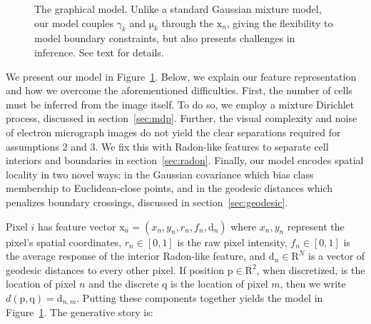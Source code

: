 \documentclass[english]{article}
\newcommand{\plate}[4]{
\begin{pgfonlayer}{b}
\node (invis#1) [draw, color=white, inner sep=6pt,rectangle,fit=#2] {};
\end{pgfonlayer}\begin{pgfonlayer}{f}
\node (capt#1) [ below left=0 pt of invis#1.south east, xshift=1pt,yshift=1pt] {\footnotesize{#3}};
\node (#1) [draw,inner sep=1pt, rectangle,fit=(invis#1) (capt#1),#4] {};
\end{pgfonlayer}
}
\newcommand{\+}[1]{\ensuremath{\boldsymbol{\mathrm{#1}}}}
\begin{document}
\begin{figure}
\centering

\caption{The graphical model. Unlike a standard Gaussian mixture model, our model couples $\gamma_k$ and $\+\mu_k$ through the $\+x_n$, giving the flexibility to model boundary constraints, but also presents challenges in inference. See text for details.}\label{fig:model}
\end{figure}

\label{sec:model}
We present our model in Figure~\ref{fig:model}. Below, we explain our feature representation and how we overcome the aforementioned difficulties. First, the number of cells must be inferred from the image itself. To do so, we employ a mixture Dirichlet process, discussed in section~\ref{sec:mdp}. Further, the visual complexity and noise of electron micrograph images do not yield the clear separations required for assumptions 2 and 3. We fix this with Radon-like features to separate cell interiors and boundaries in section~\ref{sec:radon}. Finally, our model encodes spatial locality in two novel ways: in the Gaussian covariance which bias class membership to Euclidean-close points, and in the geodesic distances which penalizes boundary crossings, discussed in section~\ref{sec:geodesic}.

Pixel $i$ has feature vector $\+{x}_n = (x_n, y_n, r_n, f_n, \+{d}_n)$ where $x_n, y_n$ represent the pixel's spatial coordinates, $r_n \in [0,1]$ is the raw pixel intensity, $f_n \in [0,1]$ is the average response of the interior Radon-like feature, and $\+{d}_n \in \+{R}^N$ is a vector of geodesic distances to every other pixel. If position $\+p \in \+R^2$, when discretized, is the location of pixel $n$ and the discrete $\+q$ is the location of pixel $m$, then we write $d(\+p, \+q) = \+d_{n,m}$. Putting these components together yields the model in Figure~\ref{fig:model}. The generative story is:
\end{document}

